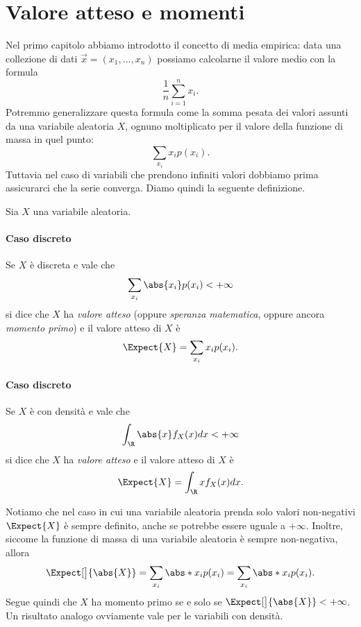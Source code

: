 \section{Valore atteso e momenti}

Nel primo capitolo abbiamo introdotto il concetto di media empirica: data una collezione di dati $\vec x = (x_1, \dots, x_n)$ possiamo calcolarne il valore medio con la formula \[
    \frac1n \sum_{i = 1}^n x_i. 
\] Potremmo generalizzare questa formula come la somma pesata dei valori assunti da una variabile aleatoria $X$, ognuno moltiplicato per il valore della funzione di massa in quel punto: \[
    \sum_{x_i} x_i p(x_i). 
\] Tuttavia nel caso di variabili che prendono infiniti valori dobbiamo prima assicurarci che la serie converga. Diamo quindi la seguente definizione.

\begin{definition}
     Sia $X$ una variabile aleatoria.
    \paragraph{Caso discreto} Se $X$ è discreta e vale che \[
        \sum_{x_i} \abs{x_i}p(x_i) < +\infty
    \] si dice che $X$ ha \emph{valore atteso} (oppure \emph{speranza matematica}, oppure ancora \emph{momento primo}) e il valore atteso di $X$ è \[
        \Expect{X} = \sum_{x_i} x_ip(x_i).    
    \]
    \paragraph{Caso discreto} Se $X$ è con densità e vale che \[
        \int_{\R} \abs{x}f_X(x)dx < +\infty
    \] si dice che $X$ ha \emph{valore atteso} e il valore atteso di $X$ è \[
        \Expect{X} = \int_{\R} xf_X(x)dx.    
    \]
\end{definition}

\begin{remark}
    Notiamo che nel caso in cui una variabile aleatoria prenda solo valori non-negativi $\Expect{X}$ è sempre definito, anche se potrebbe essere uguale a $+\infty$.
    Inoltre, siccome la funzione di massa di una variabile aleatoria è sempre non-negativa, allora \[
        \Expect[\big]{\abs{X}} = \sum_{x_i} \abs*{x_ip(x_i)} = \sum_{x_i} \abs*{x_i}p(x_i).   
    \] Segue quindi che $X$ ha momento primo se e solo se $\Expect[\big]{\abs{X}} < +\infty$. Un risultato analogo ovviamente vale per le variabili con densità.
\end{remark}

